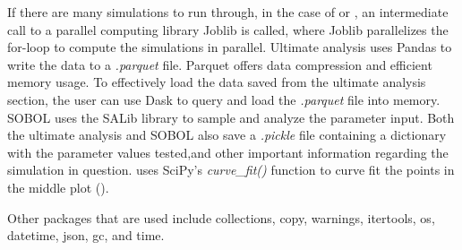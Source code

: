 If there are many simulations to run through, in the case of  or , an intermediate call to a parallel computing library Joblib is called, where Joblib parallelizes the for-loop to compute the simulations in parallel. 
Ultimate analysis uses Pandas to write the data to a \textit{.parquet} file. 
Parquet offers data compression and efficient memory usage. 
To effectively load the data saved from the ultimate analysis section, the user can use Dask to query and load the \textit{.parquet} file into memory. \newline 
SOBOL uses the SALib library to sample and analyze the parameter input. 
Both the ultimate analysis and SOBOL also save a \textit{.pickle} file containing a dictionary with the parameter values tested,and other important information regarding the simulation in question. \newline
{} uses SciPy's \textit{curve\_fit()} function to curve fit the points in the middle plot (). 

Other packages that are used include collections, copy, warnings, itertools, os, datetime, json, gc, and time. 